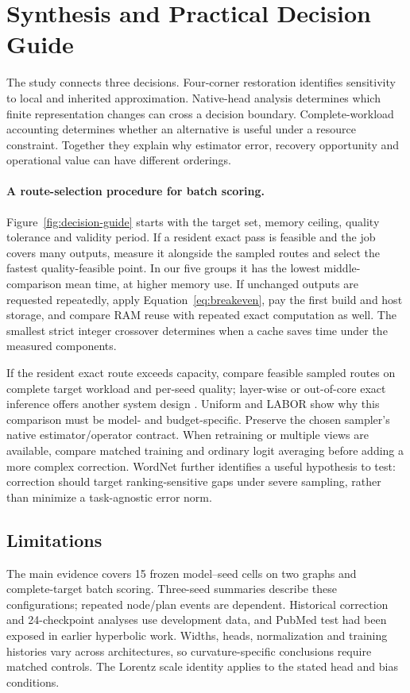 \documentclass[sigconf, nonacm]{acmart}
\begin{document}
\section{Synthesis and Practical Decision Guide}
\label{sec:discussion}
The study connects three decisions. Four-corner restoration identifies sensitivity to local and inherited approximation. Native-head analysis determines which finite representation changes can cross a decision boundary. Complete-workload accounting determines whether an alternative is useful under a resource constraint. Together they explain why estimator error, recovery opportunity and operational value can have different orderings.

\FinalDecisionGuideFigure

\paragraph{A route-selection procedure for batch scoring.}
Figure~\ref{fig:decision-guide} starts with the target set, memory ceiling, quality tolerance and validity period. If a resident exact pass is feasible and the job covers many outputs, measure it alongside the sampled routes and select the fastest quality-feasible point. In our five groups it has the lowest middle-comparison mean time, at higher memory use. If unchanged outputs are requested repeatedly, apply Equation~\eqref{eq:breakeven}, pay the first build and host storage, and compare RAM reuse with repeated exact computation as well. The smallest strict integer crossover determines when a cache saves time under the measured components.

If the resident exact route exceeds capacity, compare feasible sampled routes on complete target workload and per-seed quality; layer-wise or out-of-core exact inference offers another system design \cite{yin2022dgi}. Uniform and LABOR show why this comparison must be model- and budget-specific. Preserve the chosen sampler's native estimator/operator contract. When retraining or multiple views are available, compare matched training and ordinary logit averaging before adding a more complex correction. WordNet further identifies a useful hypothesis to test: correction should target ranking-sensitive gaps under severe sampling, rather than minimize a task-agnostic error norm.

\subsection{Limitations}
\label{sec:limitations}
The main evidence covers 15 frozen model--seed cells on two graphs and complete-target batch scoring. Three-seed summaries describe these configurations; repeated node/plan events are dependent. Historical correction and 24-checkpoint analyses use development data, and PubMed test had been exposed in earlier hyperbolic work. Widths, heads, normalization and training histories vary across architectures, so curvature-specific conclusions require matched controls. The Lorentz scale identity applies to the stated head and bias conditions.
\end{document}

